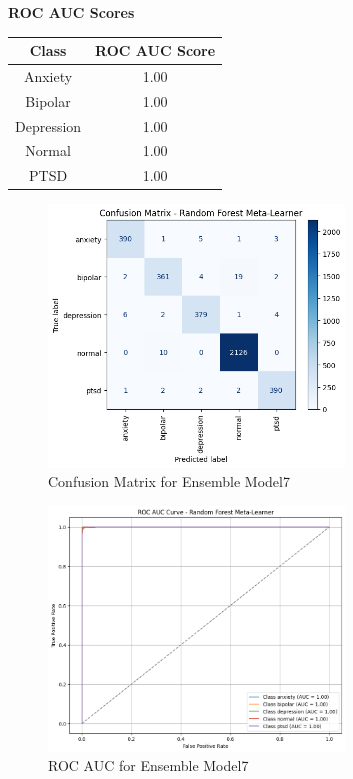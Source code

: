 \begin{center}
    \textbf{ROC AUC Scores} \\[0.5em]
    \begin{tabular}{|c|c|}
        \hline
        \textbf{Class} & \textbf{ROC AUC Score} \\ \hline
        Anxiety & 1.00 \\ \hline
        Bipolar & 1.00 \\ \hline
        Depression & 1.00 \\ \hline
        Normal & 1.00 \\ \hline
        PTSD & 1.00 \\ \hline
    \end{tabular}
\end{center}

\begin{figure}[h!]  
    \centering
    \includegraphics[width=0.7\textwidth]{Images/EM T CM.png}  
    \caption{Confusion Matrix for Ensemble Model7}
    \label{lstm arch}  %
\end{figure}

\begin{figure}[h!]  
    \centering
    \includegraphics[width=0.7\textwidth]{Images/EM T ROC.png}  
    \caption{ROC AUC for Ensemble Model7}
    \label{lstm arch}  %
\end{figure}

